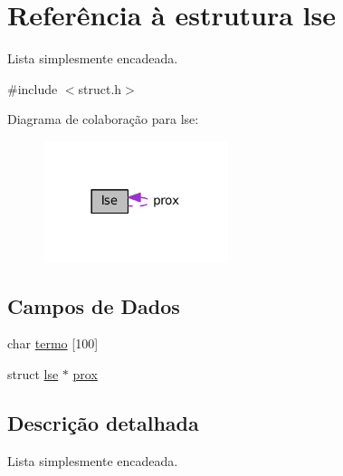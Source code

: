 \hypertarget{structlse}{}\section{Referência à estrutura lse}
\label{structlse}


Lista simplesmente encadeada.  




{\ttfamily \#include $<$struct.\+h$>$}



Diagrama de colaboração para lse\+:\nopagebreak
\begin{figure}[H]
\begin{center}
\leavevmode
\includegraphics[width=153pt]{structlse__coll__graph}
\end{center}
\end{figure}
\subsection*{Campos de Dados}
\begin{DoxyCompactItemize}
\item 
char \hyperlink{structlse_a9df8ca8433f565cd387dd62ce6023a51}{termo} \mbox{[}100\mbox{]}
\item 
struct \hyperlink{structlse}{lse} $\ast$ \hyperlink{structlse_af49f0d9ba8c6fde74ac1b0ffef3c992b}{prox}
\end{DoxyCompactItemize}


\subsection{Descrição detalhada}
Lista simplesmente encadeada. 
